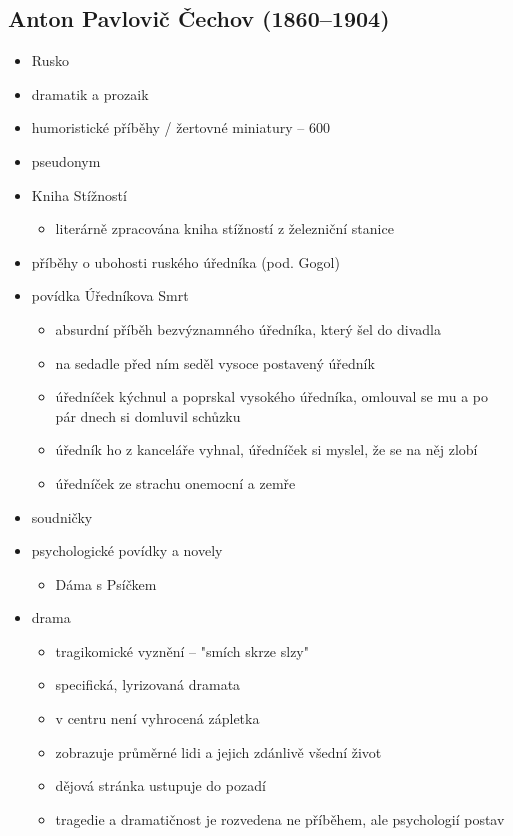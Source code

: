 \subsection{Anton Pavlovič Čechov (1860--1904)}
\begin{itemize}
\item Rusko
\item dramatik a prozaik
\item humoristické příběhy / žertovné miniatury -- 600
\item pseudonym
\item Kniha Stížností
	\begin{itemize}
	\item literárně zpracována kniha stížností z železniční stanice
	\end{itemize}
\item příběhy o ubohosti ruského úředníka (pod. Gogol)
\item povídka Úředníkova Smrt
	\begin{itemize}
	\item absurdní příběh bezvýznamného úředníka, který šel do divadla
	\item na sedadle před ním seděl vysoce postavený úředník
	\item úředníček kýchnul a poprskal vysokého úředníka, omlouval se mu a po pár dnech si domluvil schůzku
	\item úředník ho z kanceláře vyhnal, úředníček si myslel, že se na něj zlobí
	\item úředníček ze strachu onemocní a zemře
	\end{itemize}
\item soudničky
\item psychologické povídky a novely
	\begin{itemize}
	\item Dáma s Psíčkem
	\end{itemize}
\item drama
	\begin{itemize}
	\item tragikomické vyznění -- "smích skrze slzy"
	\item specifická, lyrizovaná dramata
	\item v centru není vyhrocená zápletka
	\item zobrazuje průměrné lidi a jejich zdánlivě všední život
	\item dějová stránka ustupuje do pozadí
	\item tragedie a dramatičnost je rozvedena ne příběhem, ale psychologií postav

\end{itemize}
\end{itemize}
